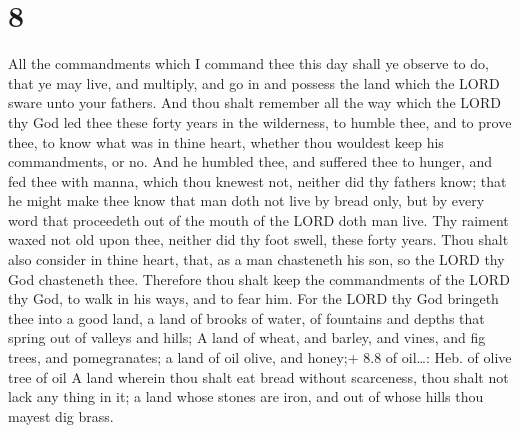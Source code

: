 \hypertarget{section-7}{%
\section{8}\label{section-7}}

 All the commandments which I command thee this day shall ye
observe to do, that ye may live, and multiply, and go in and possess the
land which the LORD sware unto your fathers.  And thou shalt
remember all the way which the LORD thy God led thee these forty years
in the wilderness, to humble thee, and to prove thee, to know what was
in thine heart, whether thou wouldest keep his commandments, or no.
 And he humbled thee, and suffered thee to hunger, and fed
thee with manna, which thou knewest not, neither did thy fathers know;
that he might make thee know that man doth not live by bread only, but
by every word that proceedeth out of the mouth of the LORD doth man
live.  Thy raiment waxed not old upon thee, neither did thy
foot swell, these forty years.  Thou shalt also consider in
thine heart, that, as a man chasteneth his son, so the LORD thy God
chasteneth thee.  Therefore thou shalt keep the commandments
of the LORD thy God, to walk in his ways, and to fear him. 
For the LORD thy God bringeth thee into a good land, a land of brooks of
water, of fountains and depths that spring out of valleys and hills;
 A land of wheat, and barley, and vines, and fig trees, and
pomegranates; a land of oil olive, and honey;+ 8.8 of oil\ldots: Heb. of
olive tree of oil  A land wherein thou shalt eat bread
without scarceness, thou shalt not lack any thing in it; a land whose
stones are iron, and out of whose hills thou mayest dig brass.

